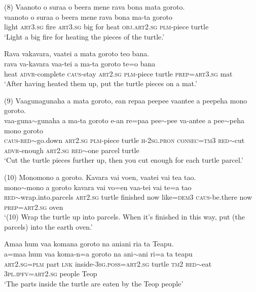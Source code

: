 \ea\label{ex:text19-47}
(8) Vaanoto o suraa o beera mene rava bona mata goroto.\\
\gll vaanoto	o	suraa	o	beera	mene	rava	bona	ma-ta	goroto\\
     light	\textsc{art}3.\textsc{sg}	fire	\textsc{art}3.\textsc{sg}	big	for	heat	\textsc{obj}.\textsc{art}2.\textsc{sg}	\textsc{plm}-piece	turtle\\
\glt `Light a big fire for heating the pieces of the turtle.'
\z

\ea\label{ex:text19-48}
Rava vakavara, vaatei a mata goroto teo bana.\\
\gll rava	va-kavara	vaa-tei	a	ma-ta	goroto	te=o	bana\\
     heat	\textsc{advr}-complete	\textsc{caus}-stay	\textsc{art}2.\textsc{sg}	\textsc{plm}-piece	turtle	\textsc{prep}=\textsc{art}3.\textsc{sg}	mat\\
\glt `After having heated them up, put the turtle pieces on a mat.'
\z

\ea\label{ex:text19-49}
(9) Vaagunagunaha a mata goroto, ean repaa peepee vaantee a peepeha mono goroto.\\
\gll vaa-guna{$\sim$}gunaha	a	ma-ta	goroto	e-an	re=paa	pee{$\sim$}pee	va-antee	a	pee{$\sim$}peha	mono	goroto\\
     \textsc{caus}-\textsc{red}{$\sim$}go.down	\textsc{art}2.\textsc{sg}	\textsc{plm}-piece	turtle	\textsc{h}-2\textsc{sg}.\textsc{pron}	\textsc{consec}=\textsc{tm}3	\textsc{red}{$\sim$}cut	\textsc{advr}-enough	\textsc{art}2.\textsc{sg}	\textsc{red}{$\sim$}one	parcel	turtle\\
\glt `Cut the turtle pieces further up, then you cut enough for each turtle parcel.'
\z

\ea\label{ex:text19-50}
(10) Monomono a goroto. Kavara vai voen, vaatei vai tea tao.\\
\gll mono{$\sim$}mono	a	goroto	kavara	vai	vo=en	vaa-tei	vai	te=a	tao\\
     \textsc{red}{$\sim$}wrap.into.parcels	\textsc{art}2.\textsc{sg}	turtle	finished	now	like=\textsc{dem}3	\textsc{caus}-be.there	now	\textsc{prep}=\textsc{art}2.\textsc{sg}	oven\\
\glt `(10) Wrap the turtle up into parcels. When it's finished in this way, put (the parcels) into the earth oven.'
\z

\ea\label{ex:text19-51}
Amaa hum vaa komana goroto na aniani ria ta Teapu.\\
\gll a=maa	hum	vaa	koma-n=a	goroto	na	ani{$\sim$}ani	ri=a	ta	teapu\\
     \textsc{art}2.\textsc{sg}=\textsc{plm}	part	\textsc{lnk}	inside-3\textsc{sg}.\textsc{poss}=\textsc{art}2.\textsc{sg}	turtle	\textsc{tm}2	\textsc{red}{$\sim$}eat	3\textsc{pl}.\textsc{ipfv}=\textsc{art}2.\textsc{sg}	people	Teop\\
\glt `The parts inside the turtle are eaten by the Teop people'
\z


